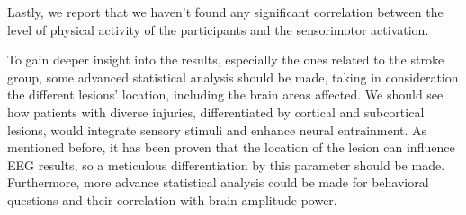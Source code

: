Lastly, we report that we haven't found any significant correlation between the level of physical activity of the participants and the sensorimotor activation. 

To gain deeper insight into the results, especially the ones related to the stroke group, some advanced statistical analysis should be made, taking in consideration the different lesions' location, including the brain areas affected. We should see how patients with diverse injuries, differentiated by cortical and subcortical lesions, would integrate sensory stimuli and enhance neural entrainment. As mentioned before, it has been proven that the location of the lesion can influence EEG results, so a meticulous differentiation by this parameter should be made. \\
Furthermore, more advance statistical analysis could be made for behavioral questions and their correlation with brain amplitude power. 